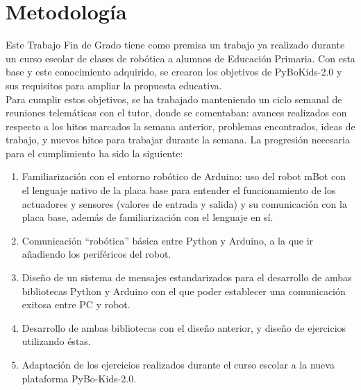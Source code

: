 \section{Metodología}\label{sec:metologia}
Este Trabajo Fin de Grado tiene como premisa un trabajo ya realizado durante un curso escolar de clases de robótica a alumnos de Educación Primaria. Con esta base y este conocimiento adquirido, se crearon los objetivos de PyBoKids-2.0 y sus requisitos para ampliar la propuesta educativa.\\
Para cumplir estos objetivos, se ha trabajado manteniendo un ciclo semanal de reuniones telemáticas con el tutor, donde se comentaban: avances realizados con respecto a los hitos marcados la semana anterior, problemas encontrados, ideas de trabajo, y nuevos hitos para trabajar durante la semana. La progresión necesaria para el cumplimiento ha sido la siguiente:
\begin{enumerate}
	\item Familiarización con el entorno robótico de Arduino: uso del robot mBot con el lenguaje nativo de la placa base para entender el funcionamiento de los actuadores y sensores (valores de entrada y salida) y su comunicación con la placa base, además de familiarización con el lenguaje en sí. 
	\item Comunicación ``robótica'' básica entre Python y Arduino, a la que ir añadiendo los periféricos del robot.
	\item Diseño de un sistema de mensajes estandarizados para el desarrollo de ambas bibliotecas Python y Arduino con el que poder establecer una comunicación exitosa entre PC y robot.
	\item Desarrollo de ambas bibliotecas con el diseño anterior, y diseño de ejercicios utilizando éstas.
	\item Adaptación de los ejercicios realizados durante el curso escolar a la nueva plataforma PyBo-Kids-2.0.  
\end{enumerate}